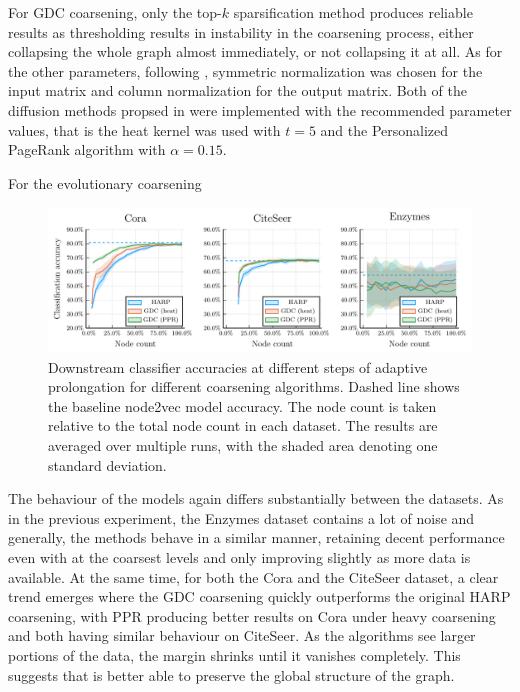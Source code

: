 For GDC coarsening, only the top-\( k \) sparsification method produces reliable results as thresholding results in instability in the coarsening process, either collapsing the whole graph almost immediately, or not collapsing it at all. As for the other parameters, following \cite{gasteiger_diffusion_2019}, symmetric normalization was chosen for the input matrix and column normalization for the output matrix. Both of the diffusion methods propsed in \cite{gasteiger_diffusion_2019} were implemented with the recommended parameter values, that is the heat kernel was used with \( t = 5 \) and the Personalized PageRank algorithm with \( \alpha = 0.15 \).

For the evolutionary coarsening 

\begin{figure}
  \centering
  \includegraphics[width=\linewidth]{images/coarsening-algorithms/coarsening-algorithms.pdf}
  \caption{Downstream classifier accuracies at different steps of adaptive prolongation for different coarsening algorithms. Dashed line shows the baseline node2vec model accuracy. The node count is taken relative to the total node count in each dataset. The results are averaged over multiple runs, with the shaded area denoting one standard deviation.}
  \label{fig:coarsening-algorithms}
\end{figure}

The behaviour of the models again differs substantially between the datasets. As in the previous experiment, the Enzymes dataset contains a lot of noise and generally, the methods behave in a similar manner, retaining decent performance even with at the coarsest levels and only improving slightly as more data is available. At the same time, for both the Cora and the CiteSeer dataset, a clear trend emerges where the GDC coarsening quickly outperforms the original HARP coarsening, with PPR producing better results on Cora under heavy coarsening and both having similar behaviour on CiteSeer. As the algorithms see larger portions of the data, the margin shrinks until it vanishes completely. This suggests that is better able to preserve the global structure of the graph.
